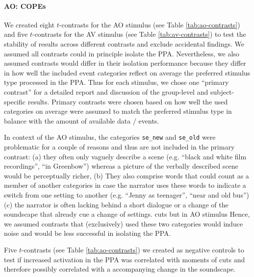 \documentclass[english]{article}
\begin{document}
\paragraph{AO: COPEs}


We created eight $t$-contrasts for the AO stimulus (see Table
\ref{tab:ao-contrasts}) and five $t$-contrasts for the AV stimulus (see Table
\ref{tab:av-contrasts}) to test the stability of results across different
contrasts and exclude accidental findings.
We assumed all contrasts could in principle isolate the PPA. Nevertheless, we
also assumed contrasts would differ in their isolation performance because they
differ in how well the included event categories reflect on average the
preferred stimulus type processed in the PPA.
Thus for each stimulus, we chose one ``primary contrast'' for a detailed report
and discussion of the group-level and subject-specific results. Primary
contrasts were chosen based on how well the used categories on average were
assumed to match the preferred stimulus type in balance with the amount of
available data / events.

In context of the AO stimulus, the categories \texttt{se\_new} and
\texttt{se\_old} were problematic for a couple of reasons and thus are not
included in the primary contrast:
(a) they often only vaguely describe a scene (e.g. ``black and white film
recordings'', ``in Greenbow'') whereas a picture of the verbally described scene
would be perceptually richer,
(b) They also comprise words that could count as a member of another categories
in case the narrator uses these words to indicate a switch from one setting to
another (e.g. ``Jenny as teenager'', ``near and old bus'')
(c) the narrator is often lacking behind a short dialogue or a change of the
soundscape that already cue a change of settings.
cuts but in AO stimulus
Hence, we assumed contrasts that (exclusively) used these two categories would
induce noise and would be less successful in isolating the PPA.

Five $t$-contrasts (see Table \ref{tab:ao-contrasts}) we created as negative
controls to test if increased activation in the PPA was correlated with
moments of cuts and therefore possibly correlated with a accompanying change in
the soundscape.
\end{document}
